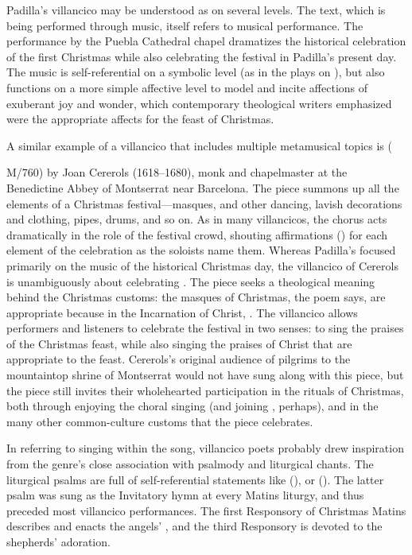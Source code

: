 Padilla's villancico may be understood as  on several levels.
The text, which is being performed through music, itself refers to musical performance.
The performance by the Puebla Cathedral chapel dramatizes the historical celebration of the first Christmas while also celebrating the festival in Padilla's present day.
The music is self-referential on a symbolic level (as in the plays on ), but also functions on a more simple affective level to model and incite affections of exuberant joy and wonder, which contemporary theological writers emphasized were the appropriate affects for the feast of Christmas. %

A similar example of a villancico that includes multiple metamusical topics is  (\signature{E-Bbc}{M/760}) by Joan Cererols (1618--1680), monk and chapelmaster at the Benedictine Abbey of Montserrat near Barcelona.%
  \autocite[81--94]{Cererols:MEM-VC}
The piece summons up all the elements of a Christmas festival---masques,  and other dancing, lavish decorations and clothing, pipes, drums, and so on.
As in many villancicos, the chorus acts dramatically in the role of the festival crowd, shouting affirmations () for each element of the celebration as the soloists name them.
Whereas Padilla's  focused primarily on the music of the historical Christmas day, the villancico of Cererols is unambiguously about celebrating .
The piece seeks a theological meaning behind the Christmas customs: the masques of Christmas, the poem says, are appropriate because in the Incarnation of Christ, . 
The villancico allows performers and listeners to celebrate the festival in two senses: to sing the praises of the Christmas feast, while also singing the praises of Christ that are appropriate to the feast.
Cererols's original audience of pilgrims to the mountaintop shrine of Montserrat would not have sung along with this piece, but the piece still invites their wholehearted participation in the rituals of Christmas, both through enjoying the choral singing (and joining , perhaps), and in the many other common-culture customs that the piece celebrates.

In referring to singing within the song, villancico poets probably drew inspiration from the genre's close association with psalmody and liturgical chants.
The liturgical psalms are full of self-referential statements like  (), or  ().
The latter psalm was sung as the Invitatory hymn at every Matins liturgy, and thus preceded most villancico performances.
The first Responsory of Christmas Matins describes and enacts the angels' , and the third Responsory is devoted to the shepherds' adoration.%
  \autocite[172--173]{Catholic:Breviarium1631}

